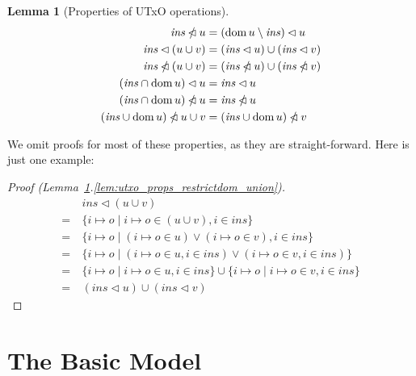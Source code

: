 \documentclass{article}
\newcommand{\restrictdom}{\lhd}
\newcommand{\subtractdom}{\mathbin{\slashed{\restrictdom}}}
\DeclareMathOperator{\dom}{dom}
\newtheorem{lemma}{Lemma}
\begin{document}
\begin{lemma}[Properties of UTxO operations]
\begin{alignat}{4}
  \mathit{ins} \subtractdom u
& = ( \dom u \setminus \mathit{ins} ) \restrictdom u
\\
  \mathit{ins} \restrictdom (u \cup v)
& = (\mathit{ins} \restrictdom u) \cup (\mathit{ins} \restrictdom v)
  \label{lem:utxo_props_restrictdom_union}
\\
  \mathit{ins} \subtractdom (u \cup v)
& = (\mathit{ins} \subtractdom u) \cup (\mathit{ins} \subtractdom v)
\\
  (\mathit{ins} \cap \dom u) \restrictdom u
& = \mathit{ins} \restrictdom u
  \label{lem:utxo_props_restrictdom_dom}
\\
  (\mathit{ins} \cap \dom u) \subtractdom u
& = \mathit{ins} \subtractdom u
  \label{lem:utxo_props_subtractdom_dom}
\\
  (\mathit{ins} \cup \dom u) \subtractdom u \cup v
& = (\mathit{ins} \cup \dom u) \subtractdom v
\label{lem:utxo_props_subtractdom_remove_dom}
\end{alignat}
\label{lem:utxo_props}
\end{lemma}
%
We omit proofs for most of these properties, as they are straight-forward.
Here is just one example:
%
\begin{proof}[Proof (Lemma~\ref{lem:utxo_props}.\ref{lem:utxo_props_restrictdom_union})]
\begin{align*}
  & ~ \mathit{ins} \restrictdom (u \cup v) \\
= & ~ \{ i \mapsto o \mid i \mapsto o \in (u \cup v), i \in \mathit{ins} \} \\
= & ~ \{ i \mapsto o \mid (i \mapsto o \in u) \vee (i \mapsto o \in v), i \in \mathit{ins} \} \\
= & ~ \{ i \mapsto o \mid (i \mapsto o \in u, i \in \mathit{ins}) \vee (i \mapsto o \in v, i \in \mathit{ins}) \} \\
= & ~ \{ i \mapsto o \mid i \mapsto o \in u, i \in \mathit{ins} \} \cup \{ i \mapsto o \mid i \mapsto o \in v, i \in \mathit{ins} \} \\
= & ~ (\mathit{ins} \restrictdom u) \cup (\mathit{ins} \restrictdom v)
\end{align*}
\end{proof}



\section{The Basic Model}
\label{sec:wallet_operations}
\end{document}
